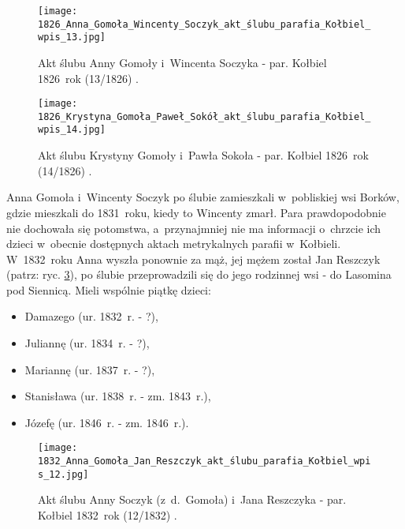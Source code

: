 \begin{figure}[!ht]
    \vspace*{0.5cm}
    \centering \texttt{[image: 
        1826\_Anna\_Gomoła\_Wincenty\_Soczyk\_akt\_ślubu\_parafia\_Kołbiel\_wpis\_13.jpg]}
    \captionsetup{format=hang}
    \caption{Akt ślubu Anny Gomoły i~Wincenta Soczyka - par. Kołbiel 1826~rok 
    (13/1826) \cite{par_kolbiel1}.}
    \label{fig:agomola_1826}
\end{figure}

\begin{figure}[!ht]
    \vspace*{0.5cm}
    \centering \texttt{[image: 
        1826\_Krystyna\_Gomoła\_Paweł\_Sokół\_akt\_ślubu\_parafia\_Kołbiel\_wpis\_14.jpg]}
    \captionsetup{format=hang}
    \caption{Akt ślubu Krystyny Gomoły i~Pawła Sokoła - par. Kołbiel 1826~rok 
    (14/1826) \cite{par_kolbiel1}.}
    \label{fig:kgomola_1826}
\end{figure}

Anna Gomoła i~Wincenty Soczyk po ślubie zamieszkali w~pobliskiej wsi Borków, 
gdzie mieszkali do 1831~roku, kiedy to Wincenty zmarł. Para prawdopodobnie 
nie dochowała się potomstwa, a~przynajmniej nie ma informacji o~chrzcie ich 
dzieci w~obecnie dostępnych aktach metrykalnych parafii w~Kołbieli. 
W~1832~roku Anna wyszła ponownie za mąż, jej mężem został Jan Reszczyk 
(patrz: ryc. \ref{fig:agomola_1832}), po ślubie przeprowadzili się do jego 
rodzinnej wsi - do Lasomina pod Siennicą. Mieli wspólnie piątkę dzieci:

\begin{itemize}
    \item Damazego (ur. 1832~r. - ?),
    \item Juliannę (ur. 1834~r. - ?),
    \item Mariannę (ur. 1837~r. - ?),
    \item Stanisława (ur. 1838~r. - zm. 1843~r.),
    \item Józefę (ur. 1846~r. - zm. 1846~r.).
  \end{itemize}

  \begin{figure}[!ht]
    \vspace*{0.5cm}
    \centering \texttt{[image: 
        1832\_Anna\_Gomoła\_Jan\_Reszczyk\_akt\_ślubu\_parafia\_Kołbiel\_wpis\_12.jpg]}
    \captionsetup{format=hang}
    \caption{Akt ślubu Anny Soczyk (z~d.~Gomoła) i~Jana Reszczyka - par. 
    Kołbiel 1832~rok (12/1832) \cite{par_kolbiel1}.}
    \label{fig:agomola_1832}
\end{figure}

